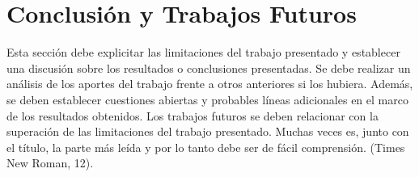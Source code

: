 \section{Conclusión y Trabajos Futuros}

Esta sección debe explicitar las limitaciones del trabajo presentado y establecer una discusión sobre los resultados o conclusiones presentadas. Se debe realizar un análisis de los aportes del trabajo frente a otros anteriores si los hubiera. Además, se deben establecer cuestiones abiertas y probables líneas adicionales en el marco de los resultados obtenidos. Los trabajos futuros se deben relacionar con la superación de las limitaciones del trabajo presentado. Muchas veces es, junto con el título, la parte más leída y por lo tanto debe ser de fácil comprensión. (Times New Roman, 12).
